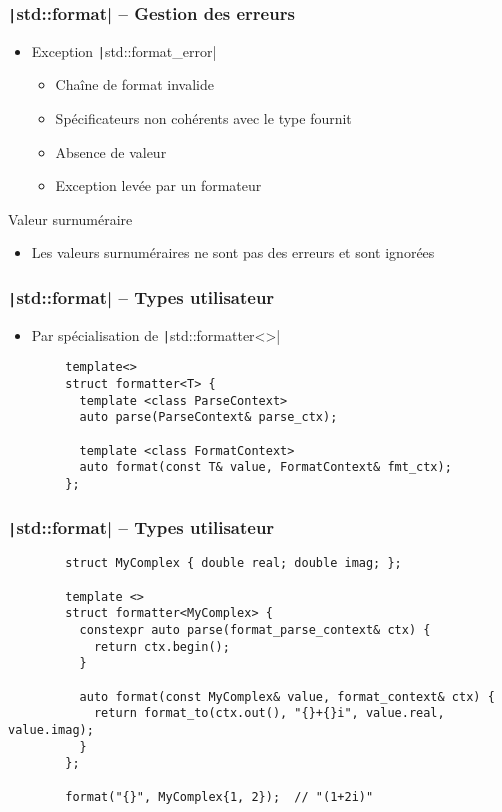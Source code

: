 \documentclass[C++.tex]{subfiles}
\begin{document}
\begin{frame}[fragile]
	\frametitle{\texttt|std::format| -- Gestion des erreurs}
	\begin{itemize}
		\item Exception \texttt|std::format_error|
		\begin{itemize}
			\item Chaîne de format invalide
			\item Spécificateurs non cohérents avec le type fournit
			\item Absence de valeur
			\item Exception levée par un formateur
		\end{itemize}
	\end{itemize}

	\begin{block}{Valeur surnuméraire}
		\begin{itemize}
			\item Les valeurs surnuméraires ne sont pas des erreurs et sont ignorées
		\end{itemize}
	\end{block}
\end{frame}

\begin{frame}[fragile]
	\frametitle{\texttt|std::format| -- Types utilisateur}
	\begin{itemize}
		\item Par spécialisation de \texttt|std::formatter<>|
	\end{itemize}

	\begin{verbatim}
		template<>
		struct formatter<T> {
		  template <class ParseContext>
		  auto parse(ParseContext& parse_ctx);

		  template <class FormatContext>
		  auto format(const T& value, FormatContext& fmt_ctx);
		};
	\end{verbatim}
\end{frame}

\begin{frame}[fragile]
	\frametitle{\texttt|std::format| -- Types utilisateur}
	\begin{verbatim}
		struct MyComplex { double real; double imag; };

		template <>
		struct formatter<MyComplex> {
		  constexpr auto parse(format_parse_context& ctx) {
		    return ctx.begin();
		  }

		  auto format(const MyComplex& value, format_context& ctx) {
		    return format_to(ctx.out(), "{}+{}i", value.real, value.imag);
		  }
		};

		format("{}", MyComplex{1, 2});  // "(1+2i)"
	\end{verbatim}
\end{frame}
\end{document}
